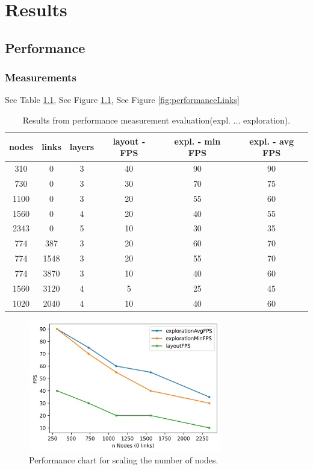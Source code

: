 \chapter{Results}

\section{Performance}

\subsection{Measurements}

See Table \ref{table:resultFPS}, See Figure \ref{fig:performanceNodes}, See Figure \ref{fig:performanceLinks}

\begin{table}
    \centering
    \begin{tabular}{ | c | c | c | c | c | c | }
        \hline
        \textbf{nodes} & \textbf{links} &\textbf{layers} &\textbf{layout - FPS} &\textbf{expl. - min FPS} &\textbf{expl. - avg FPS}\\
        \hline
        310  & 0    & 3 & 40 & 90 & 90\\ \hline
        730  & 0    & 3 & 30 & 70 & 75\\ \hline
        1100 & 0    & 3 & 20 & 55 & 60\\ \hline
        1560 & 0    & 4 & 20 & 40 & 55\\ \hline
        2343 & 0    & 5 & 10 & 30 & 35\\ \hline
        774  & 387  & 3 & 20 & 60 & 70\\ \hline
        774  & 1548 & 3 & 20 & 55 & 70\\ \hline
        774  & 3870 & 3 & 10 & 40 & 60\\ \hline
        1560 & 3120 & 4 & 5  & 25 & 45\\ \hline
        1020 & 2040 & 4 & 10 & 40 & 60\\ \hline
     \end{tabular}
     \caption{Results from performance measurement evaluation(expl. ... exploration).}
     \label{table:resultFPS}
\end{table}


\begin{figure}[h]
    \centering
    \includegraphics[width=0.75\textwidth]{graphics/performanceAnalysisNodes.png}
    \caption{Performance chart for scaling the number of nodes.} 
    \label{fig:performanceNodes} 
\end{figure}

